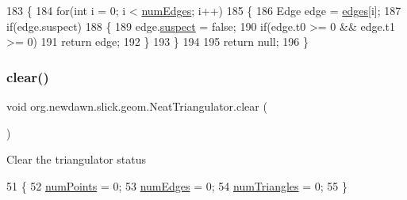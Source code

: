 \begin{DoxyCode}
183     \{
184         \textcolor{keywordflow}{for}(\textcolor{keywordtype}{int} i = 0; i < \mbox{\hyperlink{classorg_1_1newdawn_1_1slick_1_1geom_1_1_neat_triangulator_a4c9fba4faad072774b3b0fcbc7fd0fff}{numEdges}}; i++)
185         \{
186             Edge edge = \mbox{\hyperlink{classorg_1_1newdawn_1_1slick_1_1geom_1_1_neat_triangulator_a0abf260e1febb5ef0afc9894280f9efb}{edges}}[i];
187             \textcolor{keywordflow}{if}(edge.suspect)
188             \{
189                 edge.\mbox{\hyperlink{classorg_1_1newdawn_1_1slick_1_1geom_1_1_neat_triangulator_1_1_edge_a8c13f2c41069f6fbcfccb7ff5ed78e84}{suspect}} = \textcolor{keyword}{false};
190                 \textcolor{keywordflow}{if}(edge.t0 >= 0 && edge.t1 >= 0)
191                     \textcolor{keywordflow}{return} edge;
192             \}
193         \}
194 
195         \textcolor{keywordflow}{return} null;
196     \}
\end{DoxyCode}
\mbox{\label{classorg_1_1newdawn_1_1slick_1_1geom_1_1_neat_triangulator_a907a9806c7f97a03fb7f450e64d93a13}} 
\subsubsection{\texorpdfstring{clear()}{clear()}}
{\footnotesize\ttfamily void org.\+newdawn.\+slick.\+geom.\+Neat\+Triangulator.\+clear (\begin{DoxyParamCaption}{ }\end{DoxyParamCaption})\hspace{0.3cm}{\ttfamily [inline]}}

Clear the triangulator status 
\begin{DoxyCode}
51     \{
52         \mbox{\hyperlink{classorg_1_1newdawn_1_1slick_1_1geom_1_1_neat_triangulator_a24b4a230bc11d3c96dfe1de4dcb297f5}{numPoints}} = 0;
53         \mbox{\hyperlink{classorg_1_1newdawn_1_1slick_1_1geom_1_1_neat_triangulator_a4c9fba4faad072774b3b0fcbc7fd0fff}{numEdges}} = 0;
54         \mbox{\hyperlink{classorg_1_1newdawn_1_1slick_1_1geom_1_1_neat_triangulator_a5a9d015e9872ed5961cddfb49b3d1853}{numTriangles}} = 0;
55     \}
\end{DoxyCode}
\mbox{\label{classorg_1_1newdawn_1_1slick_1_1geom_1_1_neat_triangulator_a673c87f2077e95be1fc7dcfd61c02831}} 
